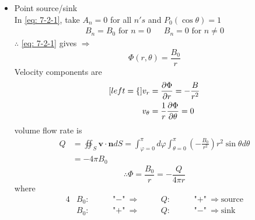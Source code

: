 \begin{itemize}
\begin{minipage}{0.5\textwidth}
\end{minipage}\\
\begin{exercise}{Show that the Stokes' stream function for uniform flow is}
\begin{equation}
\psi(r,\theta) = \frac{1}{2}Ur^2\sin^2\theta
\label{eq: 7-2-4}
\end{equation}
using
\begin{align*}
v_r = \frac{1}{r^2\sin\theta}\frac{\partial\psi}{\partial\theta}, &&v_\theta = -\frac{1}{r\sin\theta}\frac{\partial\psi}{\partial r}
\end{align*}
\end{exercise}
\item Point source/sink\\
In \eqref{eq: 7-2-1}, take $A_n = 0$ for all $n's$ and $P_0(\cos\theta)=1$
\begin{align*}
B_n = B_0\text{ for }n=0 && B_n= 0\text{ for }n\neq 0
\end{align*}
$\therefore$ \eqref{eq: 7-2-1} gives $\Longrightarrow$
\begin{equation}
\Phi(r,\theta) = \frac{B_0}{r}
\label{eq: 7-2-5}
\end{equation}
Velocity components are
\begin{subequations}
\label{eq: 7-2-6}
\begin{align}[left = \empheqlbrace\,]
v_r&=\frac{\partial\Phi}{\partial r} = -\frac{B}{r^2} \label{eq: 7-2-6a} \\
v_\theta&=\frac{1}{r}\frac{\partial\Phi}{\partial \theta} = 0  \label{eq: 7-2-6b}
\end{align}
\end{subequations}
volume flow rate is 
\begin{align*}
Q
&= \oiint_S\mathbf{v}\cdot\mathbf{n}dS = \int_{\varphi = 0}^\pi d\varphi\int_{\theta=0}^\pi\left(-\frac{B_0}{r^2}\right)r^2\sin\theta d\theta \\
&= -4\pi B_0
\end{align*}
\begin{equation}
\therefore\Phi = \frac{B_0}{r} = -\frac{Q}{4\pi r}
\label{eq: 7-2-7}
\end{equation}
where 
\begin{alignat*}{4}
& B_0\colon     \quad && \text{"$-$"}\Longrightarrow \quad && Q\colon \quad && \text{"$+$"}\Longrightarrow\text{source}\\
& B_0\colon     \quad && \text{"$+$"}\Longrightarrow \quad && Q\colon \quad && \text{"$-$"}\Longrightarrow\text{sink}

\end{alignat*}
\end{itemize}
